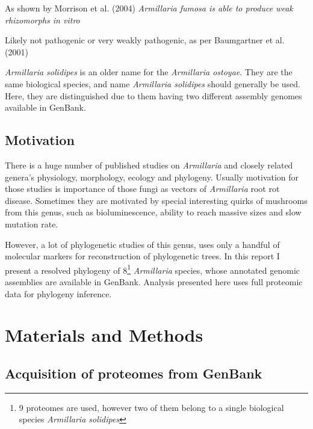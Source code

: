 \documentclass[two column, twoside, a4paper]{article}
\begin{document}
\begin{table}
\begin{center}
\begin{threeparttable}
    \begin{tablenotes}
    \item\label{tnote:fumosa}As shown by Morrison et al. (2004) \textit{Armillaria fumosa is able to produce weak rhizomorphs \textit{in vitro}}
    \item\label{tnote:nabsnona}Likely not pathogenic or very weakly pathogenic, as per Baumgartner et al. (2001)
    \item\label{tnote:solidipes}\textit{Armillaria solidipes} is an older name for the \textit{Armillaria ostoyae}. They are the same biological species, and name \textit{Armillaria solidipes} should generally be used. Here, they are distinguished due to them having two different assembly genomes available in GenBank.
    \end{tablenotes}
    \end{threeparttable}
  \end{center}
\end{table}

\subsection{Motivation}

There is a huge number of published studies on \textit{Armillaria} and closely related genera's physiology, morphology, ecology and phylogeny. Usually motivation for those studies is importance of those fungi as vectors of \textit{Armillaria} root rot disease. Sometimes they are motivated by special interesting quirks of mushrooms from this genus, such as bioluminescence, ability to reach massive sizes and slow mutation rate.

However, a lot of phylogenetic studies of this genus, uses only a handful of molecular markers for reconstruction of phylogenetic trees. In this report I present a resolved phylogeny of 8\footnote{9 proteomes are used, however two of them belong to a single biological species \textit{Armillaria solidipes}} \textit{Armillaria} species, whose annotated genomic assemblies are available in GenBank. Analysis presented here uses full proteomic data for phylogeny inference.

\section{Materials and Methods}

\subsection{Acquisition of proteomes from GenBank}
\end{document}
